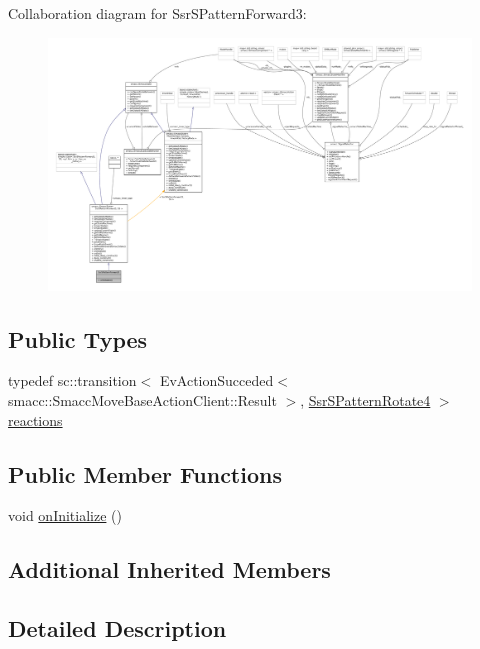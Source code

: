 Collaboration diagram for Ssr\+S\+Pattern\+Forward3\+:
\nopagebreak
\begin{figure}[H]
\begin{center}
\leavevmode
\includegraphics[width=350pt]{structSsrSPatternForward3__coll__graph}
\end{center}
\end{figure}
\subsection*{Public Types}
\begin{DoxyCompactItemize}
\item 
typedef sc\+::transition$<$ Ev\+Action\+Succeded$<$ smacc\+::\+Smacc\+Move\+Base\+Action\+Client\+::\+Result $>$, \hyperlink{structSsrSPatternRotate4}{Ssr\+S\+Pattern\+Rotate4} $>$ \hyperlink{structSsrSPatternForward3_ac63bea214725673c74948cb0febf8b7a}{reactions}
\end{DoxyCompactItemize}
\subsection*{Public Member Functions}
\begin{DoxyCompactItemize}
\item 
void \hyperlink{structSsrSPatternForward3_a9548fa20d98d23f9b90a1cdaf3c904f9}{on\+Initialize} ()
\end{DoxyCompactItemize}
\subsection*{Additional Inherited Members}


\subsection{Detailed Description}


